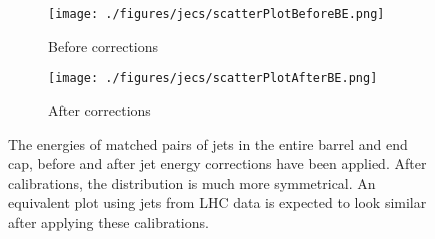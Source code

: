 \begin{figure}[htbp]
    \centering
    \begin{subfigure}[b]{0.45\textwidth}
        \texttt{[image: ./figures/jecs/scatterPlotBeforeBE.png]}
        \caption{Before corrections}
        \label{fig:detector_jecs_scatter_before_BE}
    \end{subfigure}
    \hfill
    \begin{subfigure}[b]{0.45\textwidth}
        \texttt{[image: ./figures/jecs/scatterPlotAfterBE.png]}
        \caption{After corrections}
        \label{fig:detector_jecs_scatter_after_BE}
    \end{subfigure}
\caption[The energies of matched pairs of jets in the entire barrel and end cap, before and after jet energy corrections have been applied]{The energies of matched pairs of jets in the entire barrel and end cap, before and after jet energy corrections have been applied. After calibrations, the distribution is much more symmetrical. An equivalent plot using jets from LHC data is expected to look similar after applying these calibrations.}
\label{fig:detector_jecs_scatter_BE}
\end{figure}

